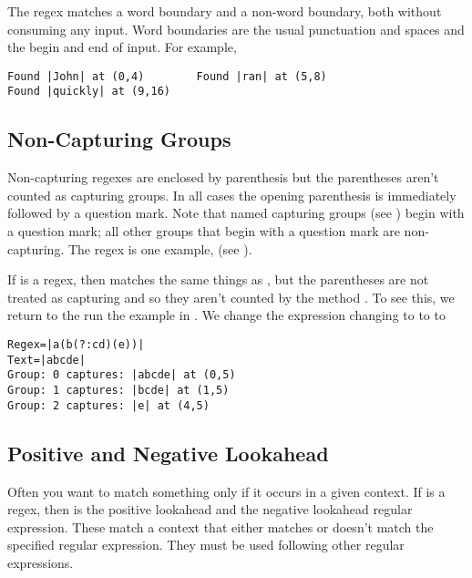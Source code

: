 The regex  matches a word boundary and  a
non-word boundary, both without consuming any input.  Word boundaries
are the usual punctuation and spaces and the begin and end of input.
For example,
%
\begin{verbatim}
Found |John| at (0,4)        Found |ran| at (5,8)    
Found |quickly| at (9,16)
\end{verbatim}

\subsection{Non-Capturing Groups}

Non-capturing regexes are enclosed by parenthesis 
but the parentheses aren't counted as capturing groups. 
In all cases the opening parenthesis is immediately followed by a question mark.
Note that named capturing groups (see ) begin with
a question mark; all other groups that begin with a question mark are non-capturing.
The regex  is one example,
(see ).

If 
is a regex, then  matches the same things as
, but the parentheses are not treated as capturing and so
they aren't counted by the method .
To see this, we return to the run the  example in .
We change the expression changing  to
to  to
%
\begin{verbatim}
Regex=|a(b(?:cd)(e))|
Text=|abcde|
Group: 0 captures: |abcde| at (0,5)
Group: 1 captures: |bcde| at (1,5)
Group: 2 captures: |e| at (4,5)
\end{verbatim}
%

\subsection{Positive and Negative Lookahead}

Often you want to match something only if it occurs in a given
context.  If  is a regex, then  is
the positive lookahead and  the negative
lookahead regular expression.  These match a context that either
matches or doesn't match the specified regular expression.  They
must be used following other regular expressions.

